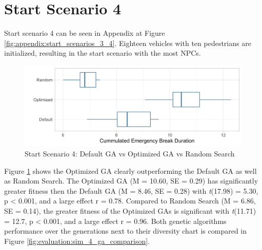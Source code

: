\section{Start Scenario 4}
Start scenario 4 can be seen in Appendix at Figure \ref{fig:appendix:start_scenarios_3_4}. Eighteen vehicles with ten pedestrians are initialized, resulting in the start scenario with the most NPCs.

\begin{figure}[ht] 
	\includegraphics[width=1\linewidth]{simulations/evaluation/plots/sim_4_comparison}
	\caption{Start Scenario 4: Default GA vs Optimized GA vs Random Search}
	\label{fig:evaluation:sim_4_comparison}
\end{figure}

Figure \ref{fig:evaluation:sim_4_comparison} shows the Optimized GA clearly outperforming the Default GA as well as Random Search.
The Optimized GA (M = 10.60, SE = 0.29) has significantly greater fitness then the Default GA (M = 8.46, SE = 0.28) with \textit{t}(17.98) = 5.30, p < 0.001, and a large effect r = 0.78.
Compared to Random Search (M = 6.86, SE = 0.14), the greater fitness of the Optimized GAs is significant with \textit{t}(11.71) = 12.7, p < 0.001, and a large effect r = 0.96. Both genetic algorithms performance over the generations next to their diversity chart is compared in Figure \ref{fig:evaluation:sim_4_ga_comparison}.

